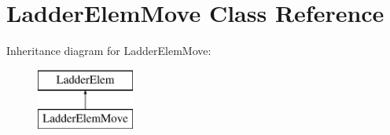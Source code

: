 \hypertarget{class_ladder_elem_move}{\section{Ladder\-Elem\-Move Class Reference}
\label{class_ladder_elem_move}
}
Inheritance diagram for Ladder\-Elem\-Move\-:\begin{figure}[H]
\begin{center}
\leavevmode
\includegraphics[height=2.000000cm]{class_ladder_elem_move}
\end{center}
\end{figure}

